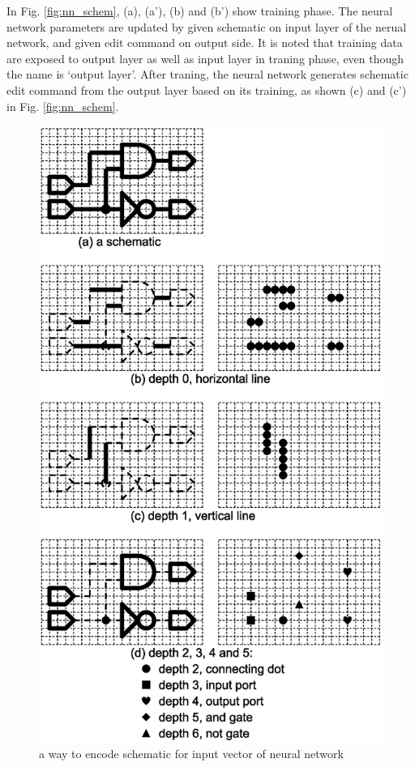 \documentclass[twocolumn]{article}
\begin{document}
In Fig. \ref{fig:nn_schem}, (a), (a'), (b) and (b') show training phase.
The neural network parameters are updated by given schematic on input layer
of the nerual network, and given edit command on output side.
It is noted that training data are exposed to output layer
as well as input layer in traning phase,
even though the name is `output layer'.
After traning, the neural network generates schematic edit command
from the output layer
based on its training, as shown (c) and (c') in Fig. \ref{fig:nn_schem}.

\begin{figure}[tb]
 \begin{center}
  \begin{minipage}{\hsize}
   \includegraphics[width=\hsize]{input_encode_03.eps}
   \caption{a way to encode schematic for input vector of neural network}
   \label{fig:input_encode}
  \end{minipage}
 \end{center}
\end{figure}
\end{document}
